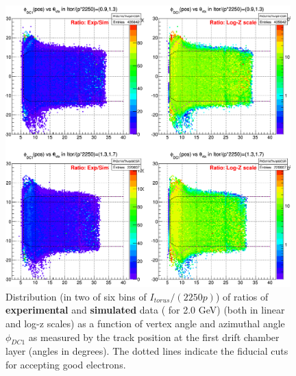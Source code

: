 \begin{figure}[H]%
\centering
\leavevmode \includegraphics[width=0.98\textwidth]{figuresEG4/NewP2/FidCuts/fidCutPlotsSet2_Eb2_RatioBiggerCroppedIpBins0n1.png}
\caption[Fiducial cuts ]{Distribution (in two of six bins of $I_{torus}/(2250 p)$) of %
ratios of {\bf experimental} and {\bf simulated} data ( for 2.0 GeV) (both in linear and log-z scales) as a function of vertex angle \th and azimuthal angle $\phi_{DC1}$ as measured by the track position at the first drift chamber layer (angles in degrees). The dotted lines indicate the fiducial cuts for accepting good electrons. %
} %
\label{figFidExpVsSim}
\end{figure}


